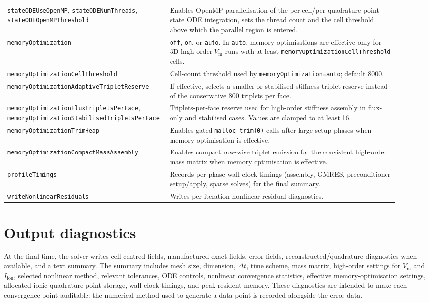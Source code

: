 \documentclass[11pt,a4paper]{article}
\newcommand{\code}[1]{\texttt{\small #1}}
\newcommand{\Vm}{V_{\text{m}}}
\newcommand{\Iion}{I_{\mathrm{ion}}}
\begin{document}
\begin{longtable}{@{}p{0.34\linewidth}p{0.58\linewidth}@{}}
\code{stateODEUseOpenMP}, \code{stateODENumThreads}, \code{stateODEOpenMPThreshold} & Enables OpenMP parallelisation of the per-cell/per-quadrature-point state ODE integration, sets the thread count and the cell threshold above which the parallel region is entered. \\
\code{memoryOptimization} & \code{off}, \code{on}, or \code{auto}. In \code{auto}, memory optimisations are effective only for 3D high-order $\Vm$ runs with at least \code{memoryOptimizationCellThreshold} cells. \\
\code{memoryOptimizationCellThreshold} & Cell-count threshold used by \code{memoryOptimization=auto}; default 8000. \\
\code{memoryOptimizationAdaptiveTripletReserve} & If effective, selects a smaller or stabilised stiffness triplet reserve instead of the conservative 800 triplets per face. \\
\code{memoryOptimizationFluxTripletsPerFace}, \code{memoryOptimizationStabilisedTripletsPerFace} & Triplets-per-face reserve used for high-order stiffness assembly in flux-only and stabilised cases. Values are clamped to at least 16. \\
\code{memoryOptimizationTrimHeap} & Enables gated \code{malloc\_trim(0)} calls after large setup phases when memory optimisation is effective. \\
\code{memoryOptimizationCompactMassAssembly} & Enables compact row-wise triplet emission for the consistent high-order mass matrix when memory optimisation is effective. \\
\code{profileTimings} & Records per-phase wall-clock timings (assembly, GMRES, preconditioner setup/apply, sparse solves) for the final summary. \\
\code{writeNonlinearResiduals} & Writes per-iteration nonlinear residual diagnostics. \\
\bottomrule
\end{longtable}

\section{Output diagnostics}

At the final time, the solver writes cell-centred fields, manufactured exact
fields, error fields, reconstructed/quadrature diagnostics when available, and
a text summary. The summary includes mesh size, dimension, $\Delta t$, time
scheme, mass matrix, high-order settings for $\Vm$ and $\Iion$, selected
nonlinear method, relevant tolerances, ODE controls, nonlinear convergence
statistics, effective memory-optimisation settings, allocated ionic
quadrature-point storage, wall-clock timings, and peak resident memory. These diagnostics are
intended to make each convergence point auditable: the numerical method used to
generate a data point is recorded alongside the error data.
\end{document}
